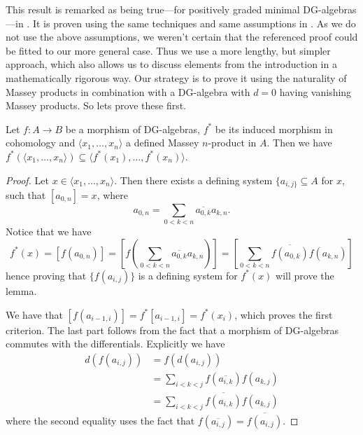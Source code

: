 This result is remarked as being true---for positively graded minimal DG-algebras---in \cite[Theorem 4.1.]{DGMS}. It is proven using the same techniques and same assumptions in \cite[Theorem 1.6.5]{exact-massey}. As we do not use the above assumptions, we weren't certain that the referenced proof could be fitted to our more general case. Thus we use a more lengthy, but simpler approach, which also allows us to discuss elements from the introduction in a mathematically rigorous way. Our strategy is to prove it using the naturality of Massey products in combination with a DG-algebra with $d=0$ having vanishing Massey products. So lets prove these first.

\begin{lemma}
\label{lm:naturality_of_massey}
Let $f\colon A\longrightarrow B$ be a morphism of DG-algebras, $f^*$ be its induced morphism in cohomology and $\langle x_1, \ldots, x_n\rangle $ a defined Massey $n$-product in $A$. Then we have $f^*( \langle x_1, \ldots, x_n\rangle) \subseteq \langle f^*(x_1), \ldots, f^*(x_n)\rangle$. 
\end{lemma}
\begin{proof}
Let $x\in \langle x_1, \ldots, x_n\rangle$. Then there exists a defining system $\{a_{i,j\}}\subseteq A$ for $x$, such that $[a_{0,n}] = x$, where  
\begin{equation*}
    a_{0,n} = \sum_{0<k<n}\overline{a_{0,k}}a_{k,n}.
\end{equation*}
Notice that we have 
\begin{equation*}
    f^*(x) = [f(a_{0,n})] = [f(\sum_{0<k<n}\overline{a_{0,k}}a_{k,n})] = [\sum_{0<k<n}\overline{f(a_{0,k})}f(a_{k,n})]
\end{equation*}
hence proving that $\{ f(a_{i,j})\}$ is a defining system for $f^*(x)$ will prove the lemma. 

We have that $[f(a_{i-1,i})] = f^*[a_{i-1,i}] = f^*(x_i)$, which proves the first criterion. The last part follows from the fact that a morphism of DG-algebras commutes with the differentials. Explicitly we have
\begin{align*}
    d(f(a_{i,j}))
    &= f(d(a_{i,j})) \\
    &= \sum_{i<k<j}f(\overline{a_{i,k}})f(a_{k,j}) \\
    &= \sum_{i<k<j}\overline{f(a_{i,k})}f(a_{k,j})
\end{align*}
where the second equality uses the fact that $f(\overline{a_{i,j}}) = \overline{f(a_{i,j})}$. 
\end{proof}

